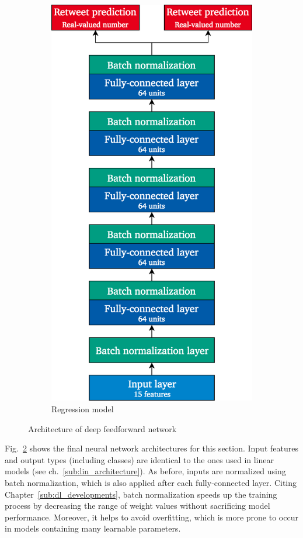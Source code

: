 \begin{figure}[h]
\begin{subfigure}{.4\textwidth}
  \includegraphics[width=.95\linewidth]{img/deep_1_regr_architecture}
  \caption{Regression model}
  \label{fig:deep1_architecture_2}
\end{subfigure}
\caption{Architecture of deep feedforward network}
\label{fig:deep1_architecture}
\end{figure}

Fig.~\ref{fig:deep1_architecture} shows the final neural network architectures
for this section.
Input features and output types (including classes) are identical to the ones
used in linear models (see ch.~\ref{sub:lin_architecture}).
As before, inputs are normalized using batch normalization, which is also applied
after each fully-connected layer.
Citing Chapter~\ref{sub:dl_developments}, batch normalization speeds up the
training process by decreasing the range of weight values without sacrificing
model performance.
Moreover, it helps to avoid overfitting, which is more prone to occur in models
containing many learnable parameters.

